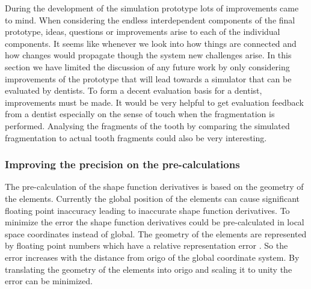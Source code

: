 
During the development of the simulation prototype 
lots of improvements came
to mind. When considering the endless interdependent
components of the final prototype, ideas, questions or improvements
arise to each of the individual components. It seems like whenever we look
into how things are connected and how changes would propagate though the
system new challenges arise.
%
In this section we have limited the discussion of any future work by only
considering improvements of the prototype that will lead towards a
simulator that can be evaluated by dentists. To form a decent
evaluation basis for a dentist, improvements must be made.
It would be very helpful to get evaluation feedback from a dentist
especially on the sense of touch when the fragmentation is
performed. Analysing the fragments of the tooth by comparing the
simulated fragmentation to actual tooth fragments could also be very
interesting. \\

\subsubsection*{Improving the precision on the pre-calculations}
The pre-calculation of the shape function derivatives is based on the
geometry of the elements. Currently the global position of the
elements can cause significant floating point inaccuracy leading to
inaccurate shape function derivatives. To minimize the error the shape
function derivatives could be pre-calculated in local space
coordinates instead of global. 
%
The geometry of the
elements are represented by floating point numbers which have a
relative representation error . So the
error increases with the distance from origo of the global coordinate
system. By translating the geometry of
the elements into origo and scaling it to unity the error can be
minimized. \\


